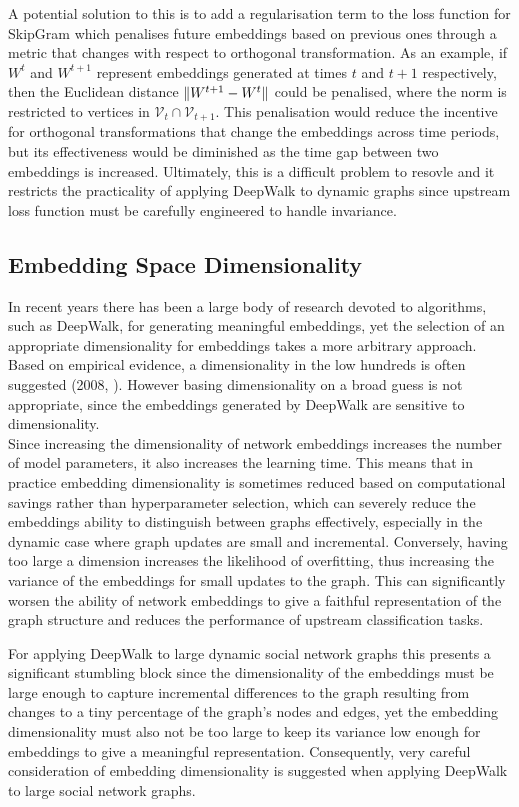 \documentclass[a4paper]{article}
\renewcommand{\V}{\mathcal V}
\begin{document}
A potential solution to this is to add a regularisation term to the loss function for SkipGram which penalises future embeddings based on previous ones through a metric that changes with respect to orthogonal
transformation. As an example, if $W^t$ and $W^{t+1}$ represent embeddings generated at times $t$ and $t+1$ respectively, then the Euclidean distance $\lVert W^{t+1} - W^t\rVert$ could be penalised,
where the norm is restricted to vertices in $\V_t \cap \V_{t+1}$. This penalisation would reduce the incentive for orthogonal transformations that change the embeddings across time periods, but its
effectiveness would be diminished as the time gap between two embeddings is increased. Ultimately, this is a difficult problem to resovle and it restricts the practicality of applying DeepWalk to dynamic graphs since upstream loss function must be carefully engineered to handle invariance.
\subsection{Embedding Space Dimensionality}
In recent years there has been a large body of research devoted to algorithms, such as DeepWalk, for generating meaningful embeddings, yet the selection of an appropriate dimensionality for embeddings
takes a more arbitrary approach. Based on empirical evidence, a dimensionality in the low hundreds is often suggested (2008, \cite{bradford2008}). However basing dimensionality on a broad guess is not appropriate, since the embeddings generated by DeepWalk are sensitive to dimensionality.\\
Since increasing the dimensionality of network embeddings increases the number of model parameters, it also increases the learning time. This means that
in practice embedding dimensionality is sometimes reduced based on computational savings rather than hyperparameter selection, which can severely reduce the embeddings ability to
distinguish between graphs effectively, especially in the dynamic case where graph updates are small and incremental.
Conversely, having too large a dimension increases the likelihood of overfitting, thus increasing the variance of the embeddings for small updates to the graph. This can significantly
worsen the ability of network embeddings to give a faithful representation of the graph structure and reduces the performance of upstream classification
tasks.

For applying DeepWalk to large dynamic social network graphs this presents a significant stumbling block since the dimensionality of the embeddings must be large enough to capture incremental differences
to the graph resulting from changes to a tiny percentage of the graph's nodes and edges, yet the embedding dimensionality must also not be too large to keep its variance low enough for embeddings to
give a meaningful representation. Consequently, very careful consideration of embedding dimensionality is suggested when applying DeepWalk to large social network graphs.
\end{document}
